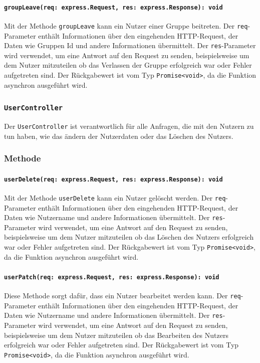 \documentclass{entwurfsheft}
\begin{document}
\paragraph{\texttt{groupLeave(req: express.Request, res: express.Response): void}}
Mit der Methode \texttt{groupLeave} kann ein Nutzer einer Gruppe beitreten. Der \texttt{req}-Parameter enthält Informationen über den eingehenden HTTP-Request, der Daten wie Gruppen Id und andere Informationen übermittelt. Der \texttt{res}-Parameter wird verwendet, um eine Antwort auf den Request zu senden, beispielsweise um dem Nutzer mitzuteilen ob das Verlassen der Gruppe erfolgreich war oder Fehler aufgetreten sind.
Der Rückgabewert ist vom Typ \texttt{Promise<void>}, da die Funktion asynchron ausgeführt wird.

\subsubsection{\texttt{UserController}}\label{sec:UserController}
Der \texttt{UserController} ist verantwortlich für alle Anfragen, die mit den Nutzern zu tun haben, wie das ändern der Nutzerdaten oder das Löschen des Nutzers.
\subsubsection*{Methode}
\paragraph{\texttt{userDelete(req: express.Request, res: express.Response): void}}
Mit der Methode \texttt{userDelete} kann ein Nutzer gelöscht werden. Der \texttt{req}-Parameter enthält Informationen über den eingehenden HTTP-Request, der Daten wie Nutzername und andere Informationen übermittelt. Der \texttt{res}-Parameter wird verwendet, um eine Antwort auf den Request zu senden, beispielsweise um dem Nutzer mitzuteilen ob das Löschen des Nutzers erfolgreich war oder Fehler aufgetreten sind.
Der Rückgabewert ist vom Typ \texttt{Promise<void>}, da die Funktion asynchron ausgeführt wird.
\paragraph{\texttt{userPatch(req: express.Request, res: express.Response): void}}
Diese Methode sorgt dafür, dass ein Nutzer bearbeitet werden kann. Der \texttt{req}-Parameter enthält Informationen über den eingehenden HTTP-Request, der Daten wie Nutzername und andere Informationen übermittelt. Der \texttt{res}-Parameter wird verwendet, um eine Antwort auf den Request zu senden, beispielsweise um dem Nutzer mitzuteilen ob das Bearbeiten des Nutzers erfolgreich war oder Fehler aufgetreten sind.
Der Rückgabewert ist vom Typ \texttt{Promise<void>}, da die Funktion asynchron ausgeführt wird.
\end{document}

